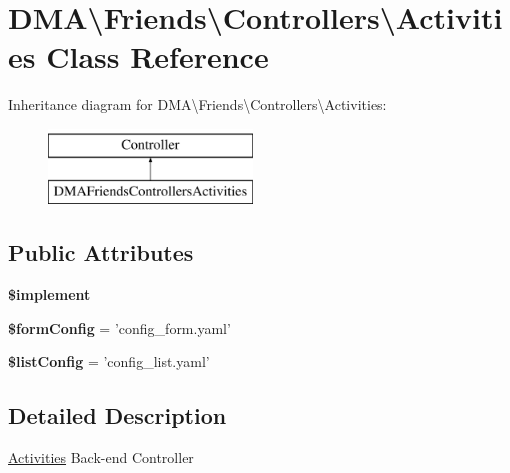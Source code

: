 \hypertarget{classDMA_1_1Friends_1_1Controllers_1_1Activities}{\section{D\-M\-A\textbackslash{}Friends\textbackslash{}Controllers\textbackslash{}Activities Class Reference}
\label{classDMA_1_1Friends_1_1Controllers_1_1Activities}
}
Inheritance diagram for D\-M\-A\textbackslash{}Friends\textbackslash{}Controllers\textbackslash{}Activities\-:\begin{figure}[H]
\begin{center}
\leavevmode
\includegraphics[height=2.000000cm]{d4/d37/classDMA_1_1Friends_1_1Controllers_1_1Activities}
\end{center}
\end{figure}
\subsection*{Public Attributes}
\begin{DoxyCompactItemize}
\item 
{\bfseries \$implement}
\item 
\hypertarget{classDMA_1_1Friends_1_1Controllers_1_1Activities_a05bd364a981c519d8288a80a0bf816d7}{{\bfseries \$form\-Config} = 'config\-\_\-form.\-yaml'}\label{classDMA_1_1Friends_1_1Controllers_1_1Activities_a05bd364a981c519d8288a80a0bf816d7}

\item 
\hypertarget{classDMA_1_1Friends_1_1Controllers_1_1Activities_ac9c246da820ff83a1c0ffe831421d26f}{{\bfseries \$list\-Config} = 'config\-\_\-list.\-yaml'}\label{classDMA_1_1Friends_1_1Controllers_1_1Activities_ac9c246da820ff83a1c0ffe831421d26f}

\end{DoxyCompactItemize}


\subsection{Detailed Description}
\hyperlink{classDMA_1_1Friends_1_1Controllers_1_1Activities}{Activities} Back-\/end Controller 

